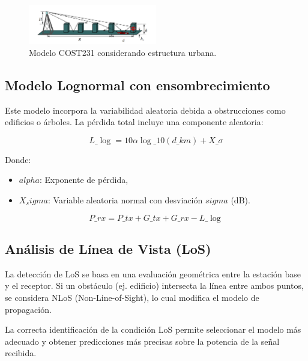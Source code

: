 \begin{figure}[H]
\centering
\includegraphics[width=0.5\textwidth]{./img/walfish.png}
\caption{Modelo COST231 considerando estructura urbana.}
\end{figure}

\subsection{Modelo Lognormal con ensombrecimiento}
Este modelo incorpora la variabilidad aleatoria debida a obstrucciones como edificios o árboles. La pérdida total incluye una componente aleatoria:

\begin{equation}
L\_{\log} = 10 \alpha \log\_{10}(d\_{km}) + X\_\sigma
\end{equation}

\noindent Donde:
\begin{itemize}
\item $alpha$: Exponente de pérdida,
\item $X_sigma$: Variable aleatoria normal con desviación $sigma$ (dB).
\end{itemize}

\begin{equation}
P\_{rx} = P\_{tx} + G\_{tx} + G\_{rx} - L\_{\log}
\end{equation}

\subsection{Análisis de Línea de Vista (LoS)}
La detección de LoS se basa en una evaluación geométrica entre la estación base y el receptor. Si un obstáculo (ej. edificio) intersecta la línea entre ambos puntos, se considera NLoS (Non-Line-of-Sight), lo cual modifica el modelo de propagación.

La correcta identificación de la condición LoS permite seleccionar el modelo más adecuado y obtener predicciones más precisas sobre la potencia de la se\~nal recibida.
